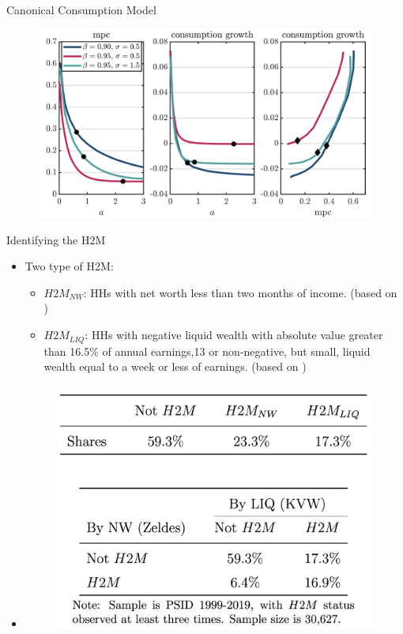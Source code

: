 \documentclass{beamer}
\begin{document}
\begin{frame}{Canonical Consumption Model}
	\label{canonical}
	\begin{figure}
		\centering
		\includegraphics[width=0.7\linewidth]{Figures/baseline_model.png}
	\end{figure}

\hyperlink{fact2}{} 
\hyperlink{fact3}{}
\end{frame}
\begin{frame}{Identifying the H2M}
	\begin{itemize}
		\item <1-> Two type of H2M:
		\begin{itemize}
			\item<2-> \textit{\textbf{$H2M_{NW}$}}: \footnotesize{HHs with net worth less than two months of income. (based on \cite{zeldes1989consumption})}
			\item<3-> \textit{\textbf{$H2M_{LIQ}$}}: \footnotesize{HHs with negative liquid wealth with absolute value greater than 16.5\% of annual earnings,13 or non-negative, but small, liquid wealth equal to a week or less of earnings. (based on \cite{kaplan2014model})}
		\end{itemize}
		\item<4->[]\begin{figure}
			\centering
			\includegraphics[width=0.5\linewidth]{Figures/Tabel1.png}
		\end{figure}
	\end{itemize}
\end{frame}
\end{document}
